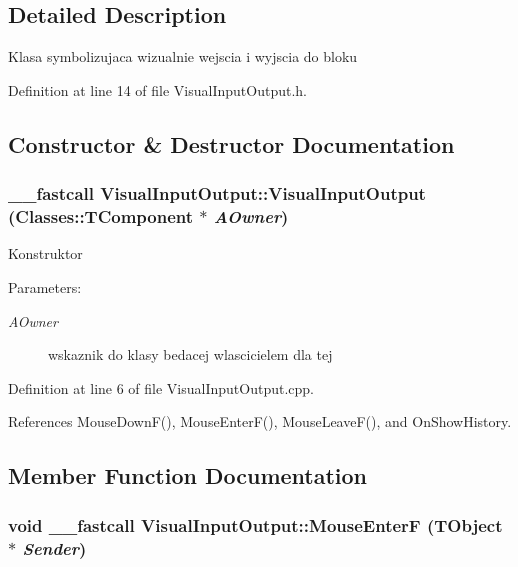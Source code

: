 \subsection{Detailed Description}
Klasa symbolizujaca wizualnie wejscia i wyjscia do bloku 

Definition at line 14 of file VisualInputOutput.h.

\subsection{Constructor \& Destructor Documentation}
\hypertarget{classVisualInputOutput_0bd9a6f7a998c00f8bd5caf6e741cc80}{
\subsubsection[VisualInputOutput]{\setlength{\rightskip}{0pt plus 5cm}\_\-\_\-fastcall VisualInputOutput::VisualInputOutput (Classes::TComponent $\ast$ {\em AOwner})}}
\label{classVisualInputOutput_0bd9a6f7a998c00f8bd5caf6e741cc80}


Konstruktor \begin{Desc}
\item[Parameters:]
\begin{description}
\item[{\em AOwner}]wskaznik do klasy bedacej wlascicielem dla tej \end{description}
\end{Desc}


Definition at line 6 of file VisualInputOutput.cpp.

References MouseDownF(), MouseEnterF(), MouseLeaveF(), and OnShowHistory.

\subsection{Member Function Documentation}
\hypertarget{classVisualInputOutput_8821c8e38a799b89c34ec72274803090}{
\subsubsection[MouseEnterF]{\setlength{\rightskip}{0pt plus 5cm}void \_\-\_\-fastcall VisualInputOutput::MouseEnterF (TObject $\ast$ {\em Sender})}}
\label{classVisualInputOutput_8821c8e38a799b89c34ec72274803090}




